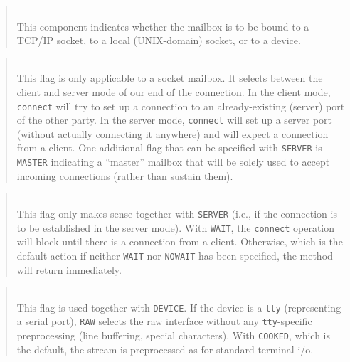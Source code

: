 \medskip

\begin{quote}
\noindent{}\\ \hspace{0in}
This component indicates whether the mailbox is to be bound to a
TCP/IP socket, to a local (UNIX-domain) socket,
or to a device.
\end{quote}

\begin{quote}
\noindent{}\\ \hspace{0in}
This flag is only applicable to a socket mailbox.
It selects between the client and server mode of our end of the
connection.
In the client mode, {\tt connect} will try to set up a connection to an
already-existing (server) port of the other party.
In the server mode, {\tt connect} will set up a server port (without
actually connecting it anywhere) and will expect a connection from a client.
One additional flag that can be specified with {\tt SERVER} is {\tt MASTER}
indicating a ``master'' mailbox that will be solely used to
accept incoming connections (rather than sustain them).
\end{quote}

\begin{quote}
\noindent{}\\ \hspace{0in}
This flag only makes sense together with {\tt SERVER} (i.e., if the
connection is to be established in the server mode).
With {\tt WAIT}, the {\tt connect} operation will block until there is
a connection from a client.
Otherwise, which is the default action if neither
{\tt WAIT} nor {\tt NOWAIT} has been specified,
the method will return immediately.
\end{quote}

\begin{quote}
\noindent{}\\ \hspace{0in}
This flag is used together with {\tt DEVICE}.
If the device is a {\tt tty} (representing a serial port), {\tt RAW}
selects the raw interface without any {\tt tty}-specific preprocessing
(line buffering, special characters).
With {\tt COOKED}, which is the default, the stream is preprocessed
as for standard terminal i/o.
\end{quote}


